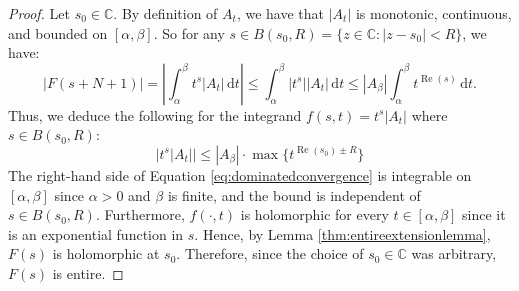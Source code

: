 \documentclass{article}
\theoremstyle{plain}
\numberwithin{equation}{section}
\numberwithin{table}{section}
\numberwithin{figure}{section}
\DeclareMathOperator{\re}{Re}
\newcommand{\vaddspace}[1]{\rule{0pt}{#1pt}}
\newcommand{\newparagraph}{\vaddspace{10}}
\begin{document}
\begin{proof}
Let $s_0 \in \mathbb{C}$. By definition of $A_t$, we have that $|A_t|$ is monotonic, continuous, and bounded on $[\alpha,\beta]$. So for any $s \in B(s_0,R) = \{z \in \mathbb{C} : |z-s_0| < R\}$, we have:
\begin{equation}
|F(s+N+1)| = \left|\int_{\alpha}^{\beta} t^s |A_t| \,\mathrm{d}t\right| \leq \int_{\alpha}^{\beta} |t^s| |A_t| \,\mathrm{d}t \leq |A_{\beta}| \int_{\alpha}^{\beta} t^{\re(s)} \,\mathrm{d}t.
\end{equation}
Thus, we deduce the following for the integrand $f(s,t) = t^s |A_t|$ where $s \in B(s_0,R)$:
\begin{equation}\label{eq:dominatedconvergence}
|t^s |A_t|| \leq |A_{\beta}| \cdot \max\{t^{\re(s_0) \pm R}\}
\end{equation}
The right-hand side of Equation \ref{eq:dominatedconvergence} is integrable on $[\alpha,\beta]$ since $\alpha > 0$ and $\beta$ is finite, and the bound is independent of $s \in B(s_0,R)$. Furthermore, $f(\cdot,t)$ is holomorphic for every $t \in [\alpha,\beta]$ since it is an exponential function in $s$. Hence, by Lemma \ref{thm:entireextensionlemma}, $F(s)$ is holomorphic at $s_0$. Therefore, since the choice of $s_0 \in \mathbb{C}$ was arbitrary, $F(s)$ is entire.
\end{proof}
\newparagraph
{

}
\end{document}
